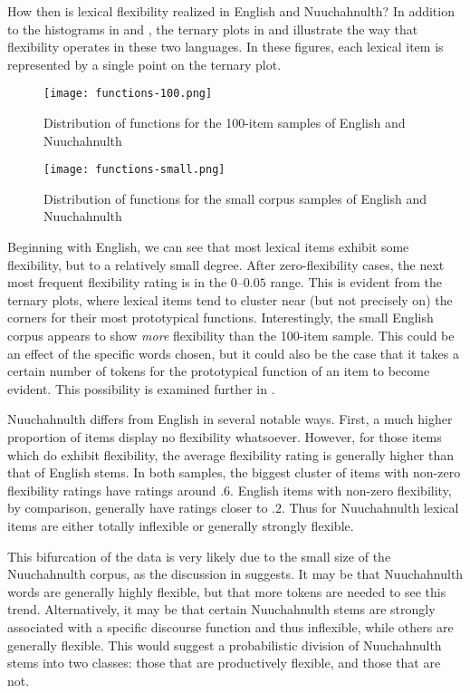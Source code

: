 How then is lexical flexibility realized in English and Nuuchahnulth? In addition to the histograms in  and , the ternary plots in  and  illustrate the way that flexibility operates in these two languages. In these figures, each lexical item is represented by a single point on the ternary plot.

\begin{figure}[h!]
  \centering
  \caption{Distribution of functions for the 100-item samples of English and Nuuchahnulth}
  \label{fig:ternary-100-items}
  \texttt{[image: functions-100.png]}
\end{figure}

\begin{figure}[h!]
  \centering
  \caption{Distribution of functions for the small corpus samples of English and Nuuchahnulth}
  \label{fig:ternary-small-corpus}
  \texttt{[image: functions-small.png]}
\end{figure}

Beginning with English, we can see that most lexical items exhibit some flexibility, but to a relatively small degree. After zero-flexibility cases, the next most frequent flexibility rating is in the $0$–$0.05$ range. This is evident from the ternary plots, where lexical items tend to cluster near (but not precisely on) the corners for their most prototypical functions. Interestingly, the small English corpus appears to show \emph{more} flexibility than the 100-item sample. This could be an effect of the specific words chosen, but it could also be the case that it takes a certain number of tokens for the prototypical function of an item to become evident. This possibility is examined further in .

Nuuchahnulth differs from English in several notable ways. First, a much higher proportion of items display no flexibility whatsoever. However, for those items which do exhibit flexibility, the average flexibility rating is generally higher than that of English stems. In both samples, the biggest cluster of items with non-zero flexibility ratings have ratings around $.6$. English items with non-zero flexibility, by comparison, generally have ratings closer to $.2$. Thus for Nuuchahnulth lexical items are either totally inflexible or generally strongly flexible.

This bifurcation of the data is very likely due to the small size of the Nuuchahnulth corpus, as the discussion in  suggests. It may be that Nuuchahnulth words are generally highly flexible, but that more tokens are needed to see this trend. Alternatively, it may be that certain Nuuchahnulth stems are strongly associated with a specific discourse function and thus inflexible, while others are generally flexible. This would suggest a probabilistic division of Nuuchahnulth stems into two classes: those that are productively flexible, and those that are not.

